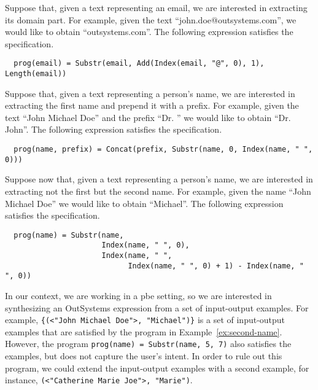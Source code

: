 \begin{example}
  Suppose that, given a text representing an email, we are interested in
  extracting its domain part.
  For example, given the text ``john.doe@outsystems.com'', we would like to
  obtain ``outsystems.com''.
  The following expression satisfies the specification.

\begin{lstlisting}
  prog(email) = Substr(email, Add(Index(email, "@", 0), 1), Length(email))
\end{lstlisting}
\end{example}

\begin{example}\label{ex:first-name}
  Suppose that, given a text representing a person's name, we are interested in
extracting the first name and prepend it with a prefix. For example, given the
text ``John Michael Doe'' and the prefix ``Dr. '' we would like to obtain
``Dr. John''. The following expression satisfies the specification.
 
\begin{lstlisting}
  prog(name, prefix) = Concat(prefix, Substr(name, 0, Index(name, " ", 0)))
\end{lstlisting}
\end{example}

\begin{example}\label{ex:second-name}
  Suppose now that, given a text representing a person's name, we are interested
in extracting not the first but the second name. For example, given the name
``John Michael Doe'' we would like to obtain ``Michael''. The following
expression satisfies the specification.
 
\begin{lstlisting}
  prog(name) = Substr(name,
                      Index(name, " ", 0),
                      Index(name, " ",
                            Index(name, " ", 0) + 1) - Index(name, " ", 0))
\end{lstlisting}
\end{example}

In our context, we are working in a \gls{pbe} setting, so we are interested in
synthesizing an OutSystems expression from a set of input-output examples.
For example, \lstinline|{(<"John Michael Doe">, "Michael")}|
is a set of input-output examples that are satisfied by the program in
Example~\ref{ex:second-name}.
However, the program \lstinline|prog(name) = Substr(name, 5, 7)|
also satisfies the examples, but does not capture the user's intent.
In order to rule out this program, we could extend the input-output examples
with a second example, for instance,
\lstinline|(<"Catherine Marie Joe">, "Marie")|.

